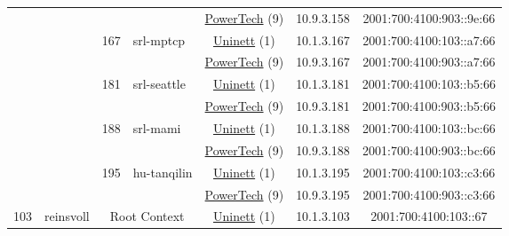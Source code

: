 \begin{small}
\begin{center}
\begin{longtable}{|c|c|c|c|c|c|c|c|}
  &  &  &  & \multicolumn{2}{|c|}{\tiny{\href{http://www.powertech.no}{PowerTech} (9)}} & \tiny{10.9.3.158} & \tiny{2001:700:4100:903::9e:66} \\* \cline{3-3}\cline{4-4}\cline{5-5}\cline{6-6}\cline{7-7}\cline{8-8}
  &  & \multirow{2}{*}{\tiny{167}} & \multicolumn{1}{|l|}{\multirow{2}{*}{\tiny{srl-mptcp}}} & \multicolumn{2}{|c|}{\tiny{\href{https://www.uninett.no}{Uninett} (1)}} & \tiny{10.1.3.167} & \tiny{2001:700:4100:103::a7:66} \\* \cline{5-5}\cline{6-6}\cline{7-7}\cline{8-8}
  &  &  &  & \multicolumn{2}{|c|}{\tiny{\href{http://www.powertech.no}{PowerTech} (9)}} & \tiny{10.9.3.167} & \tiny{2001:700:4100:903::a7:66} \\* \cline{3-3}\cline{4-4}\cline{5-5}\cline{6-6}\cline{7-7}\cline{8-8}
  &  & \multirow{2}{*}{\tiny{181}} & \multicolumn{1}{|l|}{\multirow{2}{*}{\tiny{srl-seattle}}} & \multicolumn{2}{|c|}{\tiny{\href{https://www.uninett.no}{Uninett} (1)}} & \tiny{10.1.3.181} & \tiny{2001:700:4100:103::b5:66} \\* \cline{5-5}\cline{6-6}\cline{7-7}\cline{8-8}
  &  &  &  & \multicolumn{2}{|c|}{\tiny{\href{http://www.powertech.no}{PowerTech} (9)}} & \tiny{10.9.3.181} & \tiny{2001:700:4100:903::b5:66} \\* \cline{3-3}\cline{4-4}\cline{5-5}\cline{6-6}\cline{7-7}\cline{8-8}
  &  & \multirow{2}{*}{\tiny{188}} & \multicolumn{1}{|l|}{\multirow{2}{*}{\tiny{srl-mami}}} & \multicolumn{2}{|c|}{\tiny{\href{https://www.uninett.no}{Uninett} (1)}} & \tiny{10.1.3.188} & \tiny{2001:700:4100:103::bc:66} \\* \cline{5-5}\cline{6-6}\cline{7-7}\cline{8-8}
  &  &  &  & \multicolumn{2}{|c|}{\tiny{\href{http://www.powertech.no}{PowerTech} (9)}} & \tiny{10.9.3.188} & \tiny{2001:700:4100:903::bc:66} \\* \cline{3-3}\cline{4-4}\cline{5-5}\cline{6-6}\cline{7-7}\cline{8-8}
  &  & \multirow{2}{*}{\tiny{195}} & \multicolumn{1}{|l|}{\multirow{2}{*}{\tiny{hu-tanqilin}}} & \multicolumn{2}{|c|}{\tiny{\href{https://www.uninett.no}{Uninett} (1)}} & \tiny{10.1.3.195} & \tiny{2001:700:4100:103::c3:66} \\* \cline{5-5}\cline{6-6}\cline{7-7}\cline{8-8}
  &  &  &  & \multicolumn{2}{|c|}{\tiny{\href{http://www.powertech.no}{PowerTech} (9)}} & \tiny{10.9.3.195} & \tiny{2001:700:4100:903::c3:66} \\ \hline
 \multirow{32}{*}{\tiny{103}} & \multicolumn{1}{|l|}{\multirow{32}{*}{\tiny{reinsvoll}}} & \multicolumn{2}{|c|}{\multirow{2}{*}{\tiny{Root Context}}} & \multicolumn{2}{|c|}{\tiny{\href{https://www.uninett.no}{Uninett} (1)}} & \tiny{10.1.3.103} & \tiny{2001:700:4100:103::67} \\* \cline{5-5}\cline{6-6}\cline{7-7}\cline{8-8}

\end{longtable}
\end{center}
\end{small}
